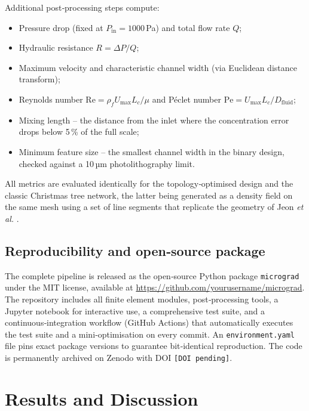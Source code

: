 \documentclass[12pt]{article}
\begin{document}
Additional post‑processing steps compute:
\begin{itemize}
\item Pressure drop (fixed at $P_{\text{in}} = 1000$ Pa) and total flow rate $Q$;
\item Hydraulic resistance $R = \Delta P / Q$;
\item Maximum velocity and characteristic channel width (via Euclidean distance transform);
\item Reynolds number $\mathrm{Re} = \rho_f U_{\max} L_c / \mu$ and Péclet number $\mathrm{Pe} = U_{\max} L_c / D_{\text{fluid}}$;
\item Mixing length – the distance from the inlet where the concentration error drops below 5 \% of the full scale;
\item Minimum feature size – the smallest channel width in the binary design, checked against a 10 µm photolithography limit.
\end{itemize}
All metrics are evaluated identically for the topology‑optimised design and the classic Christmas tree network, the latter being generated as a density field on the same mesh using a set of line segments that replicate the geometry of Jeon \textit{et al.} \cite{jeon2005}.

\subsection{Reproducibility and open‑source package}
The complete pipeline is released as the open‑source Python package \texttt{micrograd} under the MIT license, available at \url{https://github.com/yourusername/micrograd}. The repository includes all finite element modules, post‑processing tools, a Jupyter notebook for interactive use, a comprehensive test suite, and a continuous‑integration workflow (GitHub Actions) that automatically executes the test suite and a mini‑optimisation on every commit. An \texttt{environment.yaml} file pins exact package versions to guarantee bit‑identical reproduction. The code is permanently archived on Zenodo with DOI \texttt{\texttt{[DOI pending]}}.

\section{Results and Discussion}
\label{sec:results}
\end{document}
